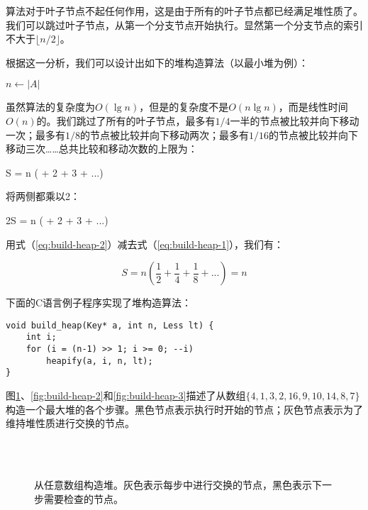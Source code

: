 \documentclass[UTF8]{article}
\begin{document}
算法对于叶子节点不起任何作用，这是由于所有的叶子节点都已经满足堆性质了。我们可以跳过叶子节点，从第一个分支节点开始执行。显然第一个分支节点的索引不大于$\lfloor n/2 \rfloor$。

根据这一分析，我们可以设计出如下的堆构造算法（以最小堆为例）：

\begin{algorithmic}[1]
  \State $n \gets |A|$
    \State {}
  \EndFor
\EndFunction
\end{algorithmic}

虽然算法的复杂度为$O(\lg n)$，但是的复杂度不是$O(n \lg n)$，而是线性时间$O(n)$的。我们跳过了所有的叶子节点，最多有$1/4$一半的节点被比较并向下移动一次；最多有$1/8$的节点被比较并向下移动两次；最多有$1/16$的节点被比较并向下移动三次……总共比较和移动次数的上限为：

\be
S = n ( + 2  + 3  + ...)
\label{eq:build-heap-1}
\ee

将两侧都乘以2：

\be
2S = n ( + 2  + 3  + ...)
\label{eq:build-heap-2}
\ee

用式（\ref{eq:build-heap-2}）减去式（\ref{eq:build-heap-1}），我们有：

\[
S = n (\frac{1}{2} + \frac{1}{4} + \frac{1}{8} + ...) = n
\]

下面的C语言例子程序实现了堆构造算法：

\lstset{language=C}
\begin{lstlisting}
void build_heap(Key* a, int n, Less lt) {
    int i;
    for (i = (n-1) >> 1; i >= 0; --i)
        heapify(a, i, n, lt);
}
\end{lstlisting}

图\ref{fig:build-heap-1}、\ref{fig:build-heap-2}和\ref{fig:build-heap-3}描述了从数组$\{4, 1, 3, 2, 16, 9, 10, 14, 8, 7\}$构造一个最大堆的各个步骤。黑色节点表示执行时开始的节点；灰色节点表示为了维持堆性质进行交换的节点。

\begin{figure}[htbp]
    \centering
     \\
     \\
    \caption{从任意数组构造堆。灰色表示每步中进行交换的节点，黑色表示下一步需要检查的节点。} \label{fig:build-heap-1}
\end{figure}
\end{document}
